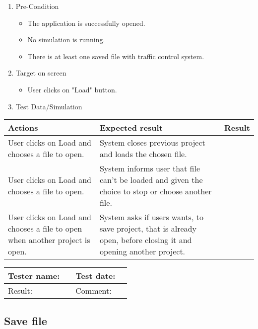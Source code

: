 \begin{enumerate}
	\item Pre-Condition
	\begin{itemize}
		\item The application is successfully opened.
		\item No simulation is running.
		\item There is at least one saved file with traffic control
		system.
	\end{itemize}
	\item Target on screen
	\begin{itemize}
		\item User clicks on "Load" button.
	\end{itemize}
	\item Test Data/Simulation
\end{enumerate}
	\begin{tabularx}{\textwidth}{|X|X|p{2.5cm}|}\hline
		Actions & Expected result & Result \\\hline
		User clicks on Load and chooses a file to open. & System closes previous project and loads the chosen file.  & \pass \\\hline 
		User clicks on Load and chooses a file to open. & System informs user that file can’t be loaded and given the choice
		to stop or choose another file. & \pass \\\hline 
		User clicks on Load and chooses a file to open when another project is open. & System asks if users wants, to save project, that is already open, before closing it and opening another project. & \pass \\\hline 
	\end{tabularx}

\begin{tabularx}{\textwidth}{|p{3cm}X|p{3cm}X|}\hline
	Tester name: &  & Test date: & \\\hline
	Result: &  \pass & Comment: & \\\hline
\end{tabularx}

\newpage
\subsection{Save file}

